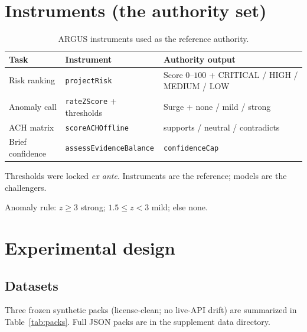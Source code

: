 \documentclass[11pt,a4paper]{article}
\begin{document}
\section{Instruments (the authority set)}

\begin{table}[t]
\centering
\begin{threeparttable}
\caption{ARGUS instruments used as the reference authority.}
\label{tab:instruments}
\begin{tabular}{@{}llp{5.6cm}@{}}
\toprule
\textbf{Task} & \textbf{Instrument} & \textbf{Authority output} \\
\midrule
Risk ranking & \texttt{projectRisk} & Score $0$--$100$ + CRITICAL / HIGH / MEDIUM / LOW \\
Anomaly call & \texttt{rateZScore} + thresholds & Surge + none / mild / strong \\
ACH matrix & \texttt{scoreACHOffline} & supports / neutral / contradicts \\
Brief confidence & \texttt{assessEvidenceBalance} & \texttt{confidenceCap} \\
\bottomrule
\end{tabular}
\begin{tablenotes}[flushleft]
\footnotesize
\item Thresholds were locked \emph{ex ante}. Instruments are the reference; models are the challengers.
\item Anomaly rule: $z \ge 3$ strong; $1.5 \le z < 3$ mild; else none.
\end{tablenotes}
\end{threeparttable}
\end{table}

\section{Experimental design}

\subsection{Datasets}
Three frozen synthetic packs (license-clean; no live-API drift) are summarized in Table~\ref{tab:packs}.
Full JSON packs are in the supplement data directory.
\end{document}

